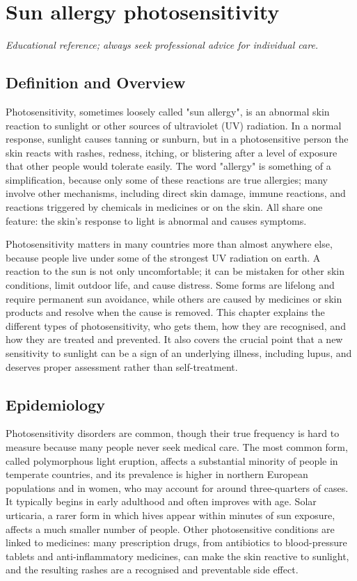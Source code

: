 \chapter{Sun allergy photosensitivity}

\medskip
\noindent\textit{Educational reference; always seek professional advice for individual care.}

\section*{Definition and Overview}
Photosensitivity, sometimes loosely called "sun allergy", is an abnormal skin reaction to sunlight or other sources of ultraviolet (UV) radiation. In a normal response, sunlight causes tanning or sunburn, but in a photosensitive person the skin reacts with rashes, redness, itching, or blistering after a level of exposure that other people would tolerate easily. The word "allergy" is something of a simplification, because only some of these reactions are true allergies; many involve other mechanisms, including direct skin damage, immune reactions, and reactions triggered by chemicals in medicines or on the skin. All share one feature: the skin's response to light is abnormal and causes symptoms.

Photosensitivity matters in many countries more than almost anywhere else, because people live under some of the strongest UV radiation on earth. A reaction to the sun is not only uncomfortable; it can be mistaken for other skin conditions, limit outdoor life, and cause distress. Some forms are lifelong and require permanent sun avoidance, while others are caused by medicines or skin products and resolve when the cause is removed. This chapter explains the different types of photosensitivity, who gets them, how they are recognised, and how they are treated and prevented. It also covers the crucial point that a new sensitivity to sunlight can be a sign of an underlying illness, including lupus, and deserves proper assessment rather than self-treatment.

\section*{Epidemiology}
Photosensitivity disorders are common, though their true frequency is hard to measure because many people never seek medical care. The most common form, called polymorphous light eruption, affects a substantial minority of people in temperate countries, and its prevalence is higher in northern European populations and in women, who may account for around three-quarters of cases. It typically begins in early adulthood and often improves with age. Solar urticaria, a rarer form in which hives appear within minutes of sun exposure, affects a much smaller number of people. Other photosensitive conditions are linked to medicines: many prescription drugs, from antibiotics to blood-pressure tablets and anti-inflammatory medicines, can make the skin reactive to sunlight, and the resulting rashes are a recognised and preventable side effect.

